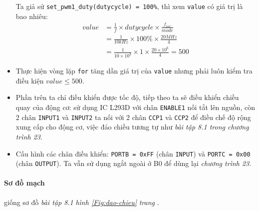 \begin{itemize}
Ta giả sử \verb|set_pwm1_duty(dutycycle) = 100%|, thì xem \verb|value| có giá trị là bao nhiêu:
\begin{align*}
value & = \frac{1}{f} \times dutycycle \times \frac{f_{osc}}{mode} \\
& = \frac{1}{10kHz} \times 100\% \times \frac{20MHz}{4} \\
& = \frac{1}{10\times 10^3} \times 1 \times \frac{20 \times 10^6}{4} = 500
\end{align*}
\item Thực hiện vòng lặp \verb|for| tăng dần giá trị của \verb|value| nhưng phải luôn kiểm tra điều kiện $value \leq 500$.
\item Phần trên ta chỉ điều khiển được tốc độ, tiếp theo ta sẽ điều khiển chiều quay của động cơ: sử dụng IC L293D với chân \verb|ENABLE1| nối tắt lên nguồn, còn 2 chân \verb|INPUT1| và \verb|INPUT2| ta nối với 2 chân \verb|CCP1| và \verb|CCP2| để điều chế độ rộng xung cấp cho động cơ, việc đảo chiều tương tự như \textit{bài tập 8.1 trong chương trình 23}.
\item Cấu hình các chân điều khiển: \verb|PORTB = 0xFF| (chân \verb|INPUT|) và \verb|PORTC = 0x00| (chân \verb|OUTPUT|). Ta vẫn sử dụng ngắt ngoài ở B0 để dùng lại \textit{chương trình 23}.
\end{itemize}
\paragraph{Sơ đồ mạch} giống sơ đồ \textit{bài tập 8.1} \textit{hình \ref{Fig:dao-chieu}} \textit{trang \pageref{Fig:dao-chieu}}.

